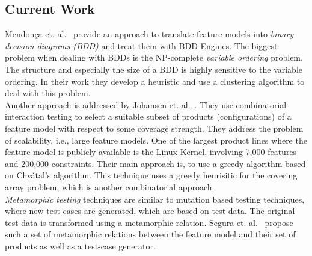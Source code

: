 \subsection{Current Work}


Mendon\c{c}a et. al.~\cite{ecr} provide an approach to translate feature models into \emph{binary decision diagrams (BDD)} and treat them with BDD Engines. The biggest problem when dealing with BDDs is the NP-complete \emph{variable ordering} problem. The structure and especially the size of a BDD is highly sensitive to the variable ordering. In their work they develop a heuristic and use a clustering algorithm to deal with this problem.\\

Another approach is addressed by Johansen et. al.~\cite{t-wise-feature-models}. They use combinatorial interaction testing to select a suitable subset of products (configurations) of a feature model with respect to some coverage strength. They address the problem of scalability, i.e., large feature models. One of the largest product lines where the feature model is publicly available is the Linux Kernel,  involving 7,000 features and 200,000 constraints. Their main approach is, to use a greedy algorithm based on Chv\'atal's algorithm. This technique uses a greedy heurisitic for the covering array problem, which is another combinatorial approach.\\

\emph{Metamorphic testing} techniques are similar to mutation based testing techniques, where new test cases are generated, which are based on test data. The original test data is transformed using a metamorphic relation. Segura et. al.~\cite{product-line-mutation-analysis} propose such a set of metamorphic relations between the feature model and their set of products as well as a test-case generator.
